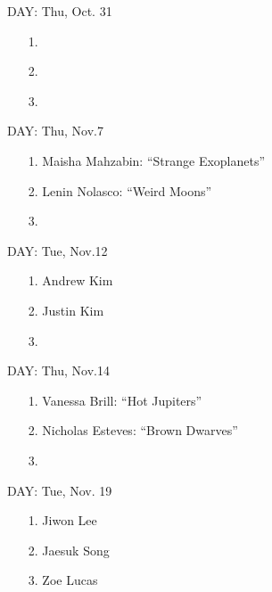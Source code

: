 \documentclass[11pt]{article}
\begin{document}
DAY:  Thu, Oct. 31

\begin{itemize}

\item[1.] 

\item[2.]

\item[3.] 

\end{itemize}


DAY:  Thu, Nov.7

\begin{itemize}

\item[1.] Maisha Mahzabin: ``Strange Exoplanets'' 

\item[2.] Lenin Nolasco: ``Weird Moons''

\item[3.]

\end{itemize}

DAY:  Tue, Nov.12

\begin{itemize}

\item[1.] Andrew Kim

\item[2.] Justin Kim

\item[3.]

\end{itemize}

DAY:  Thu, Nov.14

\begin{itemize}

\item[1.] Vanessa Brill: ``Hot Jupiters''

\item[2.] Nicholas Esteves: ``Brown Dwarves'' 

\item[3.]

\end{itemize}



DAY:  Tue, Nov. 19

\begin{itemize}

\item[1.] Jiwon Lee 

\item[2.] Jaesuk Song

\item[3.] Zoe Lucas

\end{itemize}
\end{document}
